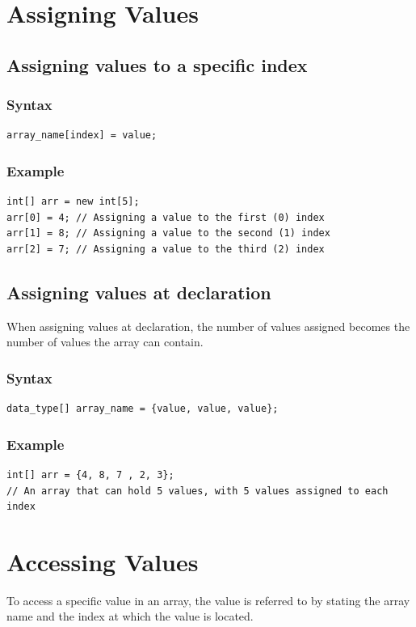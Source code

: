 \documentclass[a4paper]{article}
\begin{document}
\section*{Assigning Values}

\subsection*{Assigning values to a specific index}

\subsubsection*{Syntax}
\begin{lstlisting}
array_name[index] = value;
\end{lstlisting}

\subsubsection*{Example}
\begin{lstlisting}
int[] arr = new int[5];
arr[0] = 4; // Assigning a value to the first (0) index
arr[1] = 8; // Assigning a value to the second (1) index
arr[2] = 7; // Assigning a value to the third (2) index
\end{lstlisting}

\subsection*{Assigning values at declaration}
When assigning values at declaration, the number of values assigned becomes the
number of values the array can contain.

\subsubsection*{Syntax}
\begin{lstlisting}
data_type[] array_name = {value, value, value};
\end{lstlisting}

\subsubsection*{Example}
\begin{lstlisting}
int[] arr = {4, 8, 7 , 2, 3};
// An array that can hold 5 values, with 5 values assigned to each index
\end{lstlisting}

\section*{Accessing Values}
To access a specific value in an array, the value is referred to by stating the
array name and the index at which the value is located.
\end{document}
